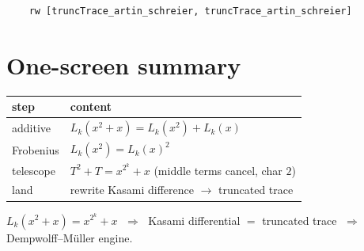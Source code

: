 \documentclass[11pt]{article}
\begin{document}
\begin{lstlisting}
    rw [truncTrace_artin_schreier, truncTrace_artin_schreier]
\end{lstlisting}

\bigskip

\section*{One-screen summary}

\begin{center}
\renewcommand{\arraystretch}{1.6}
\begin{tabular}{l l}
\textbf{step} & \textbf{content} \\
\hline
additive & $L_k(x^2+x)=L_k(x^2)+L_k(x)$ \\
Frobenius & $L_k(x^2)=L_k(x)^2$ \\
telescope & $T^2+T = x^{2^k}+x$ \;(middle terms cancel, char $2$) \\
land & rewrite Kasami difference $\to$ truncated trace \\
\end{tabular}
\end{center}

\bigskip
\noindent
\colorbox{leanbg}{\parbox{\dimexpr\linewidth-2\fboxsep}{\centering
$L_k(x^2+x)=x^{2^k}+x$ $\;\Rightarrow\;$ Kasami differential $=$ truncated trace
$\;\Rightarrow\;$ Dempwolff--M\"uller engine.}}
\end{document}
